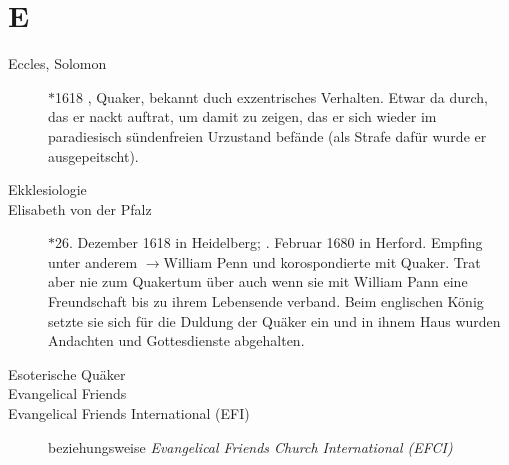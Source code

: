 \section*{E}

\articlesize

\begin{description}

 \item[Eccles, Solomon] $\ast$1618 , Quaker,  bekannt duch exzentrisches Verhalten. Etwar da durch, das er nackt auftrat, um damit zu zeigen, das er sich wieder im paradiesisch sündenfreien Urzustand befände (als Strafe dafür wurde er ausgepeitscht).

 \item[Ekklesiologie]

 \item[Elisabeth von der Pfalz] $\ast$26. Dezember 1618 in Heidelberg; . Februar 1680 in Herford. Empfing unter anderem $\to$William Penn und korospondierte mit Quaker. Trat aber nie zum Quakertum über auch wenn sie mit William Pann eine Freundschaft bis zu ihrem Lebensende verband. Beim englischen König setzte sie sich für die Duldung der Quäker ein und in ihnem Haus wurden Andachten und Gottesdienste abgehalten.

  \item[Esoterische Quäker]

 \item[Evangelical Friends]


 \item[Evangelical Friends International (EFI)] beziehungsweise \textit{Evangelical Friends Church International (EFCI)}

 \end{description}

\normalsize
